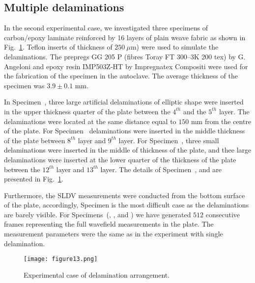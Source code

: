 \subsection{Multiple delaminations}
In the second experimental case, we investigated three specimens of carbon/epoxy laminate reinforced by 16 layers of plain weave fabric as shown in Fig.~\ref{fig:plate_delam_arrangment}. 
Teflon inserts of thickness of \(250\ \mu\)m) were used to simulate the delaminations.
The prepregs GG 205 P (fibres Toray FT 300–3K 200 tex) by G. Angeloni and epoxy resin IMP503Z‐HT by Impregnatex Compositi were used for the fabrication of the specimen in the autoclave. 
The average thickness of the specimen was \(3.9 \pm 0.1\) mm.

In Specimen~, three large artificial delaminations of elliptic shape were inserted in the upper thickness quarter of the plate between the \(4^{th}\) and the \(5^{th}\) layer.
The delaminations were located at the same distance equal to \(150\) mm from the centre of the plate.
For Specimen~ delaminations were inserted in the middle thickness of the plate between \(8^{th}\) layer and \(9^{th}\) layer.
For Specimen~, three small delaminations were inserted in the middle of thickness of the plate, and thee large delaminations were inserted at the lower quarter of the thickness of the plate between the \(12^{th}\) layer and \(13^{th}\) layer.
The details of Specimen~,  and  are presented in Fig.~\ref{fig:plate_delam_arrangment}.

Furthermore, the SLDV measurements were conducted from the bottom surface of the plate, accordingly, Specimen  is the most difficult case as the delaminations are barely visible.
For Specimens~(, , and )  we have generated \(512\) consecutive frames representing the full wavefield measurements in the plate.
The measurement parameters were the same as in the experiment with single delamination.
\begin{figure}[!h]
	\centering
	\texttt{[image: figure13.png]}
	\caption{Experimental case of delamination arrangement.}
	\label{fig:plate_delam_arrangment}
\end{figure}

